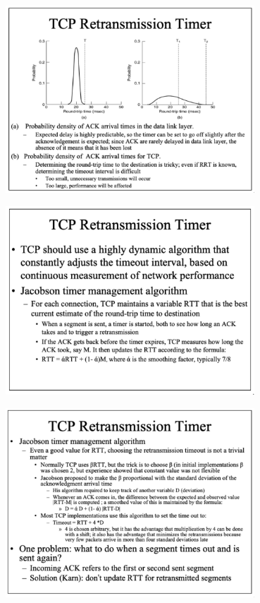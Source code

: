 \documentclass[11pt]{article}
\begin{document}
\begin{center}
    \includegraphics[width=0.7\textwidth]{tcptransmissiontimer.png}
\end{center}
\begin{center}
    \includegraphics[width=0.7\textwidth]{tcpretransmissiontimer.png}
\end{center}
\begin{center}
    \includegraphics[width=0.7\textwidth]{tcpretransmissiontimer1.png}
\end{center}


% 
\end{document}
